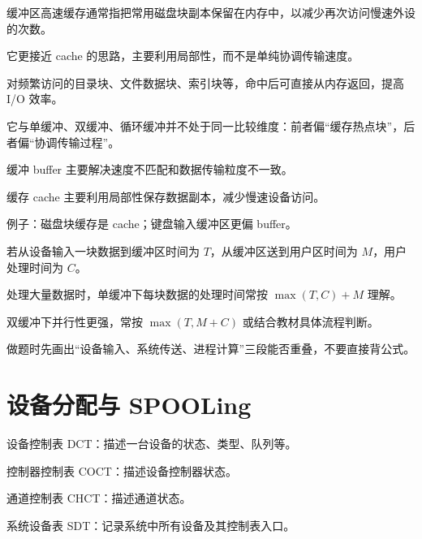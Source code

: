 \begin{points}
  \item 缓冲区高速缓存通常指把常用磁盘块副本保留在内存中，以减少再次访问慢速外设的次数。
  \item 它更接近 cache 的思路，主要利用局部性，而不是单纯协调传输速度。
  \item 对频繁访问的目录块、文件数据块、索引块等，命中后可直接从内存返回，提高 I/O 效率。
  \item 它与单缓冲、双缓冲、循环缓冲并不处于同一比较维度：前者偏“缓存热点块”，后者偏“协调传输过程”。
\end{points}


\begin{points}
  \item 缓冲 buffer 主要解决速度不匹配和数据传输粒度不一致。
  \item 缓存 cache 主要利用局部性保存数据副本，减少慢速设备访问。
  \item 例子：磁盘块缓存是 cache；键盘输入缓冲区更偏 buffer。
\end{points}


\begin{points}
  \item 若从设备输入一块数据到缓冲区时间为 $T$，从缓冲区送到用户区时间为 $M$，用户处理时间为 $C$。
  \item 处理大量数据时，单缓冲下每块数据的处理时间常按 $\max(T,C)+M$ 理解。
  \item 双缓冲下并行性更强，常按 $\max(T,M+C)$ 或结合教材具体流程判断。
  \item 做题时先画出“设备输入、系统传送、进程计算”三段能否重叠，不要直接背公式。
\end{points}


\section{设备分配与 SPOOLing}
\begin{points}
  \item 设备控制表 DCT：描述一台设备的状态、类型、队列等。
  \item 控制器控制表 COCT：描述设备控制器状态。
  \item 通道控制表 CHCT：描述通道状态。
  \item 系统设备表 SDT：记录系统中所有设备及其控制表入口。
\end{points}


